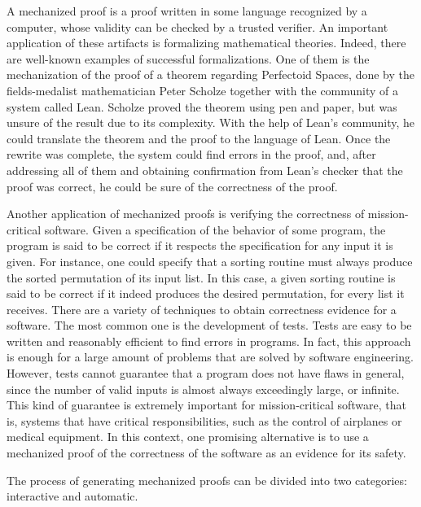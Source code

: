 A mechanized proof is a proof written in some language recognized by a computer, whose validity can be checked by a trusted verifier. An important application of these artifacts is formalizing mathematical theories. Indeed, there are well-known examples of successful formalizations. One of them is the mechanization of the proof of a theorem regarding Perfectoid Spaces\cite{scholze}, done by the fields-medalist mathematician Peter Scholze together with the community of a system called Lean\cite{lean}. Scholze proved the theorem using pen and paper, but was unsure of the result due to its complexity. With the help of Lean's community, he could translate the theorem and the proof to the language of Lean. Once the rewrite was complete, the system could find errors in the proof, and, after addressing all of them and obtaining confirmation from Lean's checker that the proof was correct, he could be sure of the correctness of the proof.

Another application of mechanized proofs is verifying the correctness of mission-critical software. Given a specification of the behavior of some program, the program is said to be correct if it respects the specification for any input it is given. For instance, one could specify that a sorting routine must always produce the sorted permutation of its input list. In this case, a given sorting routine is said to be correct if it indeed produces the desired permutation, for every list it receives. There are a variety of techniques to obtain correctness evidence for a software. The most common one is the development of tests. Tests are easy to be written and reasonably efficient to find errors in programs. In fact, this approach is enough for a large amount of problems that are solved by software engineering. However, tests cannot guarantee that a program does not have flaws in general, since the number of valid inputs is almost always exceedingly large, or infinite. This kind of guarantee is extremely important for mission-critical software, that is, systems that have critical responsibilities, such as the control of airplanes or medical equipment. In this context, one promising alternative is to use a mechanized proof of the correctness of the software as an evidence for its safety.

The process of generating mechanized proofs can be divided
into two categories: interactive and automatic.

